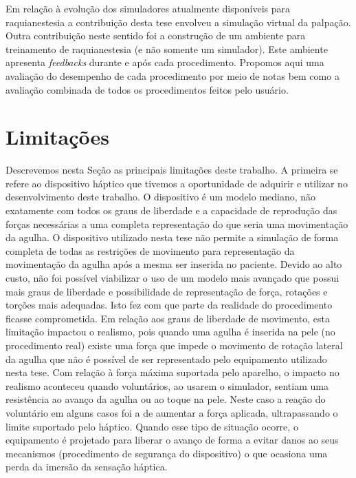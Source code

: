 Em relação à evolução dos simuladores atualmente disponíveis para raquianestesia a contribuição desta tese envolveu a simulação virtual da palpação. Outra contribuição neste sentido foi a construção de um ambiente para treinamento de raquianestesia (e não somente um simulador). Este ambiente apresenta \textit{feedbacks} durante e após cada procedimento. Propomos aqui uma avaliação do desempenho de cada procedimento por meio de notas bem como a avaliação combinada de todos os procedimentos feitos pelo usuário. 

\section{Limitações}

Descrevemos nesta Seção as principais limitações deste trabalho. A primeira se refere ao dispositivo háptico que tivemos a oportunidade de adquirir e utilizar no desenvolvimento deste trabalho. O dispositivo é um modelo mediano, não exatamente com todos os graus de liberdade e a capacidade de reprodução das forças necessárias a uma completa representação do que seria uma movimentação da agulha. O dispositivo utilizado nesta tese não permite a simulação de forma completa de todas as restrições de movimento para representação da movimentação da agulha após a mesma ser inserida no paciente. Devido ao alto custo, não foi possível viabilizar o uso de um modelo mais avançado que possui mais graus de liberdade e possibilidade de representação de força, rotações e torções mais adequadas. Isto fez com que parte da realidade do procedimento ficasse comprometida. Em relação aos graus de liberdade de movimento, esta limitação impactou o realismo, pois quando uma agulha é inserida na pele (no procedimento real) existe uma força que impede o movimento de rotação lateral da agulha que não é possível de ser representado pelo equipamento utilizado nesta tese. Com relação à força máxima suportada pelo aparelho, o impacto no realismo aconteceu quando voluntários, ao usarem o simulador, sentiam uma resistência ao avanço da agulha ou ao toque na pele. Neste caso a reação do voluntário em alguns casos foi a de aumentar a força aplicada, ultrapassando o limite suportado pelo háptico. Quando esse tipo de situação ocorre, o equipamento é projetado para liberar o avanço de forma a evitar danos ao seus mecanismos (procedimento de segurança do dispositivo) o que ocasiona uma perda da imersão da sensação háptica.

